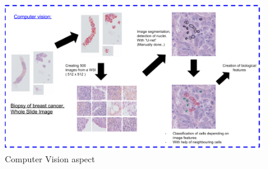 \documentclass[a4paper,10pt]{article}
\begin{document}
\begin{figure}[!ht]
\centering
\includegraphics[width=\textwidth]{ComputerVision.png}
\caption{Computer Vision aspect}
\label{ComputerVision}
\end{figure}
\end{document}
